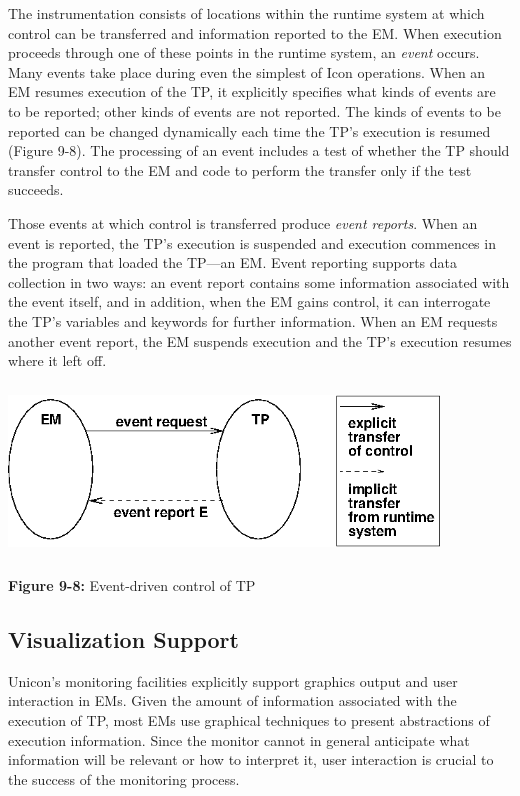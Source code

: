 The instrumentation consists of locations within the runtime
system at which control can be transferred and information reported to
the EM.  When execution proceeds through one of these points in the
runtime system, an {\em event\/} occurs.
Many events take place during even the simplest of Icon operations.
When an EM resumes execution of the TP, it explicitly specifies what
kinds of events are to be reported; other kinds of events are not
reported. The kinds of events to be reported can be
changed dynamically each time the TP's execution is resumed (Figure 9-8).
The processing of an event
includes a test of whether the TP should transfer control to the EM
and code to perform the transfer only if the test succeeds.

Those events at which control is transferred produce {\em event reports\/}.
When an event is reported, the TP's execution is suspended
and execution commences in the program that loaded the TP---an EM.
Event reporting supports data collection in two ways: an event report
contains some information associated with the event itself, and in
addition, when the EM gains control, it can interrogate the TP's variables
and keywords for further information.  When an EM requests another
event report, the EM suspends execution and the TP's execution resumes
where it left off.

\begin{center}
\includegraphics[width=27pc,height=1.8in]{execinf.png}
\end{center}

{\sffamily\bfseries Figure 9-8:}
{\sffamily Event-driven control of TP}

\subsection*{Visualization Support}

Unicon's monitoring facilities explicitly support graphics output and
user interaction in EMs.
Given the amount of information associated with the execution of TP, most
EMs use graphical techniques to present abstractions of execution
information.  Since the monitor cannot in general anticipate what
information will be relevant or how to interpret it, user interaction is
crucial to the success of the monitoring process.

